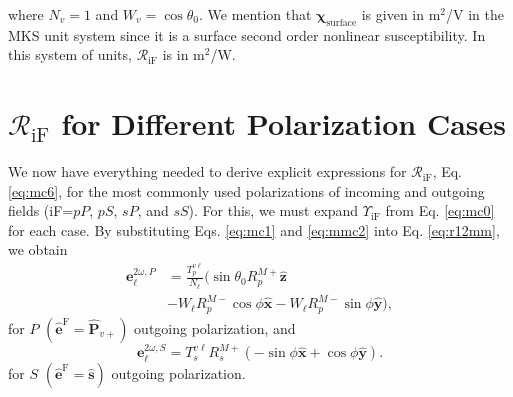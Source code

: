 \documentclass[aps,prb,10pt,showpacs,letterpaper,twocolumn]{revtex4-1}
\begin{document}
where $N_{v} = 1$ and $W_{v} = \cos\theta_{0}$. We mention that
$\boldsymbol{\chi}_{\mathrm{surface}}$ is given in m$^{2}$/V in the MKS unit
system since it is a surface second order nonlinear susceptibility. In this
system of units, $\mathcal{R}_{\mathrm{iF}}$ is in m$^{2}$/W.



\section{\texorpdfstring{$\mathcal{R}_{\mathrm{iF}}$}{R} for Different
Polarization Cases}\label{sec:rcases}

We now have everything needed to derive explicit expressions for
$\mathcal{R}_{\mathrm{iF}}$, Eq. \eqref{eq:mc6}, for the most commonly used
polarizations of incoming and outgoing fields (iF=$pP$, $pS$, $sP$, and $sS$).
For this, we must expand $\Upsilon_{\mathrm{iF}}$ from Eq. \eqref{eq:mc0} for
each case. By substituting Eqs. \eqref{eq:mc1} and \eqref{eq:mmc2} into Eq.
\eqref{eq:r12mm}, we obtain
\begin{equation}\label{eq:e2wpmr}
\begin{split}
\mathbf{e}^{2\omega,P}_{\ell} &=
\frac{T^{v\ell}_{p}}{N_{\ell}}
\big(
  \sin\theta_{0}R^{M+}_{p}\hat{\mathbf{z}}\\
&- W_{\ell}R^{M-}_{p}\cos\phi\hat{\mathbf{x}}
- W_{\ell}R^{M-}_{p}\sin\phi\hat{\mathbf{y}}
\big),
\end{split}
\end{equation}
for $P$ $(\hat{\mathbf{e}}^{\mathrm{F}} = \hat{\mathbf{P}}_{v+})$ outgoing
polarization, and
\begin{equation}\label{eq:e2wsmr}
\mathbf{e}^{2\omega,S}_{\ell} =
T_{s}^{v\ell}R^{M+}_{s}
\left(
- \sin\phi\hat{\mathbf{x}}
+ \cos\phi\hat{\mathbf{y}}
\right).
\end{equation}
for $S$ $(\hat{\mathbf{e}}^{\mathrm{F}} = \hat{\mathbf{s}})$ outgoing
polarization.
\end{document}
